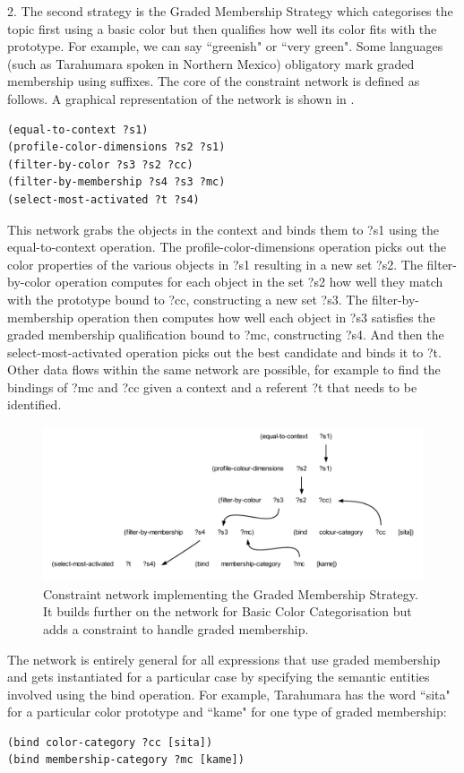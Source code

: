2. The second strategy is the {\bfshape Graded Membership Strategy} which categorises the topic first using 
a basic color but then qualifies how well its color fits with the prototype. For example, we can say ``greenish" or
``very green". Some languages (such as Tarahumara spoken in Northern Mexico) obligatory mark graded membership using 
suffixes. The core of the constraint network is defined as follows. A graphical representation of the network is shown
in . 
\begin{verbatim}
(equal-to-context ?s1) 
(profile-color-dimensions ?s2 ?s1)
(filter-by-color ?s3 ?s2 ?cc)
(filter-by-membership ?s4 ?s3 ?mc)
(select-most-activated ?t ?s4)
\end{verbatim}
This network grabs the objects in the context and binds them to ?s1 using the equal-to-context operation. 
The profile-color-dimensions operation picks out the color properties of the various objects in ?s1 resulting in 
a new set ?s2. The filter-by-color operation computes for each object in the set ?s2
how well they match with the prototype bound to ?cc, constructing a new set ?s3. The filter-by-membership operation 
then computes how well 
each object in ?s3 satisfies the graded membership qualification bound to ?mc, 
constructing ?s4. And then the select-most-activated operation picks out the best candidate and binds it to ?t. 
Other data flows within the same network are possible, for example to find the bindings of ?mc and ?cc given 
a context and a referent ?t that needs to be identified. 


\begin{figure}[htbp]
  \centerline{\includegraphics[width=1.0\textwidth]{chap11/figs/graded}}
\caption{\label{fig:graded} 
Constraint network implementing the Graded Membership Strategy. It builds further on the network for Basic Color
Categorisation but adds a constraint to handle graded membership. }
\end{figure}

The network is entirely general for all expressions that use graded membership and gets instantiated for a particular 
case by specifying the semantic entities involved using the bind operation. For example, Tarahumara has the word 
``sita" for a particular color prototype and ``kame" for one type of graded membership: 
\begin{verbatim}
(bind color-category ?cc [sita])
(bind membership-category ?mc [kame]) 
\end{verbatim}

